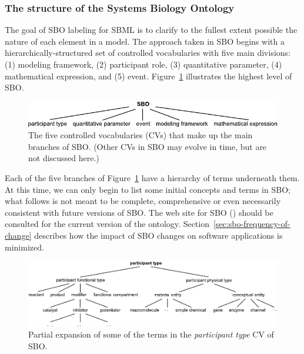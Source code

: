 \subsubsection{The structure of the Systems Biology Ontology}

The goal of SBO labeling for SBML is to clarify to the fullest
extent possible the nature of each element in a
model.  The approach taken in SBO begins with a
hierarchically-structured set of controlled vocabularies with five
main divisions: (1) modeling framework, (2) participant role, (3)
quantitative parameter, (4) mathematical expression, and (5) event.
Figure~\ref{fig:sbo-top-level} illustrates the highest level of
SBO.

\begin{figure}[tbh]
  \vspace*{1ex}
  \centering
  \includegraphics[scale = 0.9]{figs/sbo-top-level}
  \caption{The five controlled vocabularies (CVs) that make up the
    main branches of SBO.  (Other CVs in SBO may evolve in time,
    but are not discussed here.)}
  \label{fig:sbo-top-level}
\end{figure}

Each of the five branches of Figure~\ref{fig:sbo-top-level} have a
hierarchy of terms underneath them.  At this time, we can only
begin to list some initial concepts and terms in SBO; what follows
is not meant to be complete, comprehensive or even necessarily
consistent with future versions of SBO.  The web site for SBO
(\sboref) should be consulted for the current version of the
ontology.  Section~\ref{sec:sbo-frequency-of-change} describes how
the impact of SBO changes on software applications is minimized.

\begin{figure}[htb]
  \vspace*{1ex}
  \centering
  \includegraphics[scale = 0.9]{figs/sbo-participant-type}
  \caption{Partial expansion of some of the terms in the
    \emph{participant type} CV of SBO.}
  \label{fig:expanded-species}
\end{figure}

